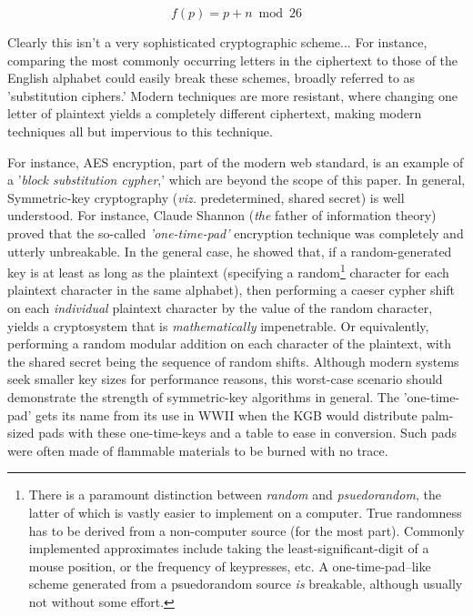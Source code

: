 \documentclass[11pt, a4paper]{report}
\begin{document}
\[
f(p) = p + n \bmod 26 
\]




Clearly this isn't a very sophisticated cryptographic scheme... For instance, comparing the most commonly occurring letters in the ciphertext to those of the English alphabet could easily break these schemes, broadly referred to as 'substitution ciphers.'\autocite[54]{koblitz} 
Modern techniques are more resistant, where changing one letter of plaintext yields a completely different ciphertext, making modern techniques all but impervious to this technique. 
  
  For instance, AES encryption, part of the modern web standard, is an example of a '\textit{block substitution cypher},' which are beyond the scope of this paper. 
In general, Symmetric-key cryptography (\textit{viz.} predetermined, shared secret) is well understood. For instance, Claude Shannon (\textit{the} father of information theory) proved that the so-called \textit{'one-time-pad'} encryption technique was completely and utterly unbreakable. 
In the general case, he showed that, if a random-generated key is at least as long as the plaintext (specifying a random\footnote{There is a paramount distinction between \textit{random} and \textit{psuedorandom}, the latter of which is vastly easier to implement on a computer. True randomness has to be derived from a non-computer source (for the most part). Commonly implemented approximates include taking the least-significant-digit of a mouse position, or the frequency of keypresses, etc. 
A one-time-pad–like scheme generated from a psuedorandom source \textit{is} breakable, although usually not without some effort.} character for each plaintext character in the same alphabet), then performing a caeser cypher shift on each \textit{individual} plaintext character by the value of the random character, yields a cryptosystem that is \textit{mathematically} impenetrable. 
Or equivalently, performing a random modular addition on each character of the plaintext, with the shared secret being the sequence of random shifts.\autocite{claude} %
Although modern systems seek smaller key sizes for performance reasons, this worst-case scenario should demonstrate the strength of symmetric-key algorithms in general. The 'one-time-pad' gets its name from its use in WWII when the KGB would distribute palm-sized pads with these one-time-keys and a table to ease in conversion. Such pads were often made of flammable materials to be burned with no trace.\autocite{lewand} 
  
\end{document}
